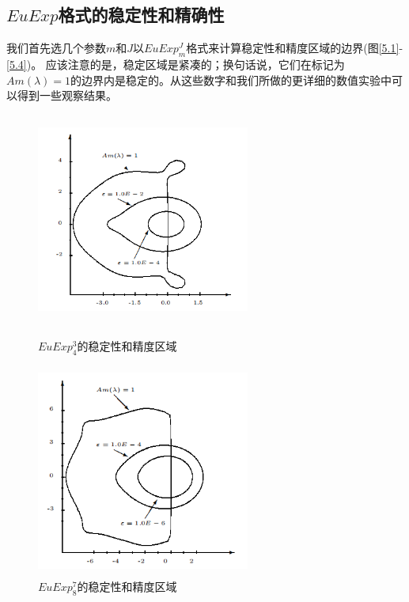 \documentclass[12pt,a4paper]{article}
\begin{document}
\subsection{$EuExp$格式的稳定性和精确性}

我们首先选几个参数$m$和$J$以$EuExp^{J}_{m}$格式来计算稳定性和精度区域的边界(图\ref{5.1}-\ref{5.4})。 应该注意的是，稳定区域是紧凑的；换句话说，它们在标记为$Am(\lambda)=1$的边界内是稳定的。从这些数字和我们所做的更详细的数值实验中可以得到一些观察结果。\\
\begin{figure}[H]
	{
		\begin{minipage}{6cm}
			\centering
			\includegraphics[width=7cm,height=7cm]{./figures/1.png}
			\caption{$EuExp_{4}^{3}$的稳定性和精度区域}
			\label{5.1}
		\end{minipage}
	}	
	{
		\begin{minipage}{6cm}
			\centering
			\includegraphics[width=7cm,height=7cm]{./figures/2.png}
			\caption{$EuExp_{8}^{7}$的稳定性和精度区域}
			\label{5.2}
		\end{minipage}
	}
\end{figure}
\end{document}
